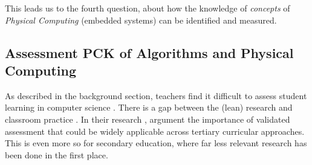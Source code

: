 This leads us to the fourth question, about how the knowledge of \emph{concepts} of \emph{Physical Computing} (embedded systems) can be identified and measured.



\subsection*{Assessment PCK of Algorithms and Physical Computing}
As described in the background section, teachers find it difficult to assess student learning in computer science \cite{yadav2016pck}. There is a gap between the (lean) research and classroom practice \cite{Yadav2015}. In their research , argument the importance of validated assessment that could be widely applicable across tertiary curricular approaches. This is even more so for secondary education, where far less relevant research has been done in the first place.






